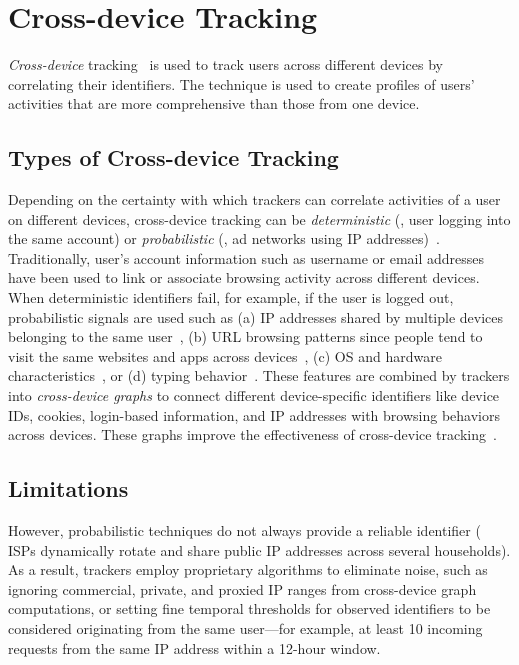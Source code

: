 \section{Cross-device Tracking}
\label{sec:cross-device}
\textit{Cross-device} tracking~\cite{brookmanCrossDeviceTrackingMeasurement2017,zimmeckPrivacyAnalysisCrossdevice2017} is used to track users across different devices by correlating their identifiers. The technique is used to create profiles of users’ activities that are more comprehensive than those from one device.

\subsection{Types of Cross-device Tracking}

Depending on the certainty with which trackers can correlate activities of a user on different devices, cross-device tracking can be \textit{deterministic} (\eg{}, user logging into the same account) or \textit{probabilistic} (\eg{}, ad networks using IP addresses)~\cite{kimProbabilisticVisitorStitching2017,cottaOffPolicyEvaluationProbabilistic2019}. Traditionally, user’s account information such as username or email addresses have been  used to link or associate browsing activity across different devices. When deterministic identifiers fail, for example, if the user is logged out, probabilistic signals are used such as (a) IP addresses shared by multiple devices belonging to the same user~\cite{diaz-moralesCrossDeviceTrackingMatching2015}, (b) URL browsing patterns since people tend to visit the same websites and apps across devices~\cite{phanCrossDeviceMatching2017}, (c) OS and hardware characteristics~\cite{caoCrossBrowserFingerprintingOS2017}, or (d) typing behavior~\cite{yuanCrossdeviceTrackingIdentification2018}. These features are combined by trackers into \textit{cross-device graphs} to connect different device-specific identifiers like device IDs, cookies, login-based information, and IP addresses with browsing behaviors across devices. These graphs improve the effectiveness of cross-device tracking~\cite{zimmeckPrivacyAnalysisCrossdevice2017,wangGraphTrackGraphbasedCrossDevice2022}.

\subsection{Limitations}

However, probabilistic techniques do not always provide a reliable identifier (\eg{} ISPs dynamically rotate and share public IP addresses across several households). As a result, trackers employ proprietary algorithms to eliminate noise, such as ignoring commercial, private, and proxied IP ranges from cross-device graph computations, or setting fine temporal thresholds for observed identifiers to be considered originating from the same user---for example, at least 10 incoming requests from the same IP address within a 12-hour window.

